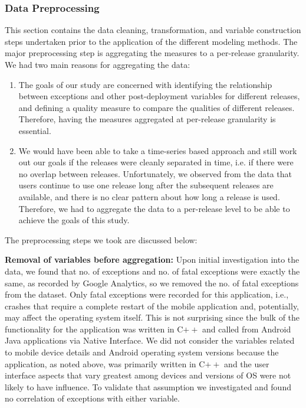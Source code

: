 \documentclass[smallcondensed]{svjour3}     %
\begin{document}
\subsubsection{Data Preprocessing}

This section contains the data cleaning, transformation, and variable 
construction steps undertaken prior to the application of the different modeling 
methods. The major preprocessing step is aggregating the measures to a per-release 
granularity. We had two main reasons for aggregating the data:
\begin{enumerate}
\item The goals of our study are concerned with identifying the relationship between exceptions and other post-deployment variables for different releases, and defining a quality measure to compare the qualities of different releases. Therefore, having the measures aggregated at per-release granularity is essential.
\item We would have been able to take a time-series based approach and still work out our goals if the releases were cleanly separated in time, i.e. if there were no overlap between releases. Unfortunately, we observed from the data that users continue to use one release long after the subsequent releases are available, and there is no clear pattern about how long a release is used. Therefore, we had to aggregate the data to a per-release level to be able to achieve the goals of this study.
\end{enumerate}

The preprocessing steps we took are discussed below:

\textbf{Removal of variables before aggregation: } Upon initial
investigation into the data, we found that no. of exceptions and
no. of fatal exceptions were exactly the same, as recorded by Google
Analytics, so we removed the no. of fatal exceptions from the
dataset. Only fatal exceptions were recorded for this application,
i.e., crashes that require a complete restart of the mobile
application and, potentially, may affect the operating system
itself.  This is not surprising since the bulk of the functionality
for the application was written in C$++$ and called from Android
Java applications via Native Interface.
We did not consider the variables related to mobile device
details and Android operating system versions because the
application, as noted above, was primarily written in C$++$ and the
user interface aspects that vary greatest among devices and versions
of OS were not likely to have influence. To validate that
assumption we investigated and found no
correlation of exceptions with either variable. 
\end{document}
